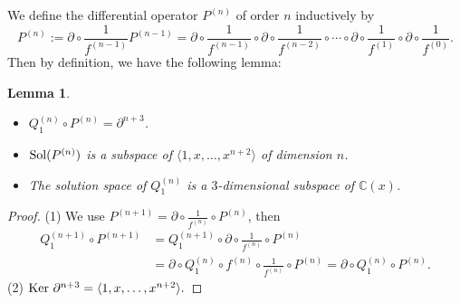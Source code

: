 \documentclass[a4paper,12pt]{article}
\newtheorem{lemma}[thm]{Lemma}
\theoremstyle{definition}
\theoremstyle{remark}
\numberwithin{equation}{section} %
\begin{document}
We define the differential operator $P^{(n)}$ of order $n$ inductively by
$$P^{(n)}:=\partial\circ\frac1{f^{(n-1)}}P^{(n-1)}=\partial\circ\frac1{f^{(n-1)}}\circ \partial\circ\frac1{f^{(n-2)}}\circ\cdots\circ \partial\circ\frac1{f^{(1)}}\circ \partial\circ\frac1{f^{(0)}}.$$
%
Then by definition,  we have the following lemma:

\begin{lemma}\label{explicit1113} 
\begin{itemize}
\item[{\rm(1)}]
$Q_1^{(n)}\circ P^{(n)}=\partial^{n+3}$.
\item[{\rm(2)}]
${\rm Sol} (P^{(n)})$ is a subspace of $\langle 1,x,\dots,x^{n+2}\rangle$
of dimension $n$.
\item[{\rm(3)}]
The solution space of $Q_1^{(n)}$ is a $3$-dimensional subspace of $\mathbb{C}(x)$.
\end{itemize}
\end{lemma}
\begin{proof}
(1) We use $P^{(n+1)} = \partial \circ \frac{1}{f^{(n)}} \circ P^{(n)}$,
then 
$$\begin{array}{ll}Q_1^{(n+1)}\circ P^{(n+1)} &= Q_1^{(n+1)}\circ\partial
  \circ \frac{1}{f^{(n)}} \circ P^{(n)}\\[2mm]
  & = \partial\circ Q_1^{(n)}\circ f^{(n)}\circ \frac{1}{f^{(n)}}
  \circ P^{(n)} =\partial\circ Q_1^{(n)}\circ P^{(n)}.\end{array}$$
(2) ${\rm Ker\ } \partial^{n+3} = \langle 1,x,\dots,x^{n+2}\rangle.$
\end{proof} %
\end{document}
